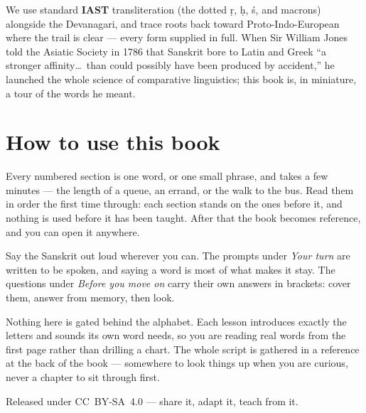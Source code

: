 \documentclass[11pt,twoside]{book}
\begin{document}
We use standard \textbf{IAST} transliteration (the dotted \d{r}, \d{h}, \'{s}, and
macrons) alongside the Devanagari, and trace roots back toward Proto-Indo-European
where the trail is clear --- every form supplied in full. When Sir William Jones
told the Asiatic Society in 1786 that Sanskrit bore to Latin and Greek ``a
stronger affinity\ldots\ than could possibly have been produced by accident,'' he
launched the whole science of comparative linguistics; this book is, in miniature,
a tour of the words he meant.

\section*{How to use this book}

Every numbered section is one word, or one small phrase, and takes a few
minutes --- the length of a queue, an errand, or the walk to the bus. Read them
in order the first time through: each section stands on the ones before it, and
nothing is used before it has been taught. After that the book becomes
reference, and you can open it anywhere.

Say the Sanskrit out loud wherever you can. The prompts under \emph{Your turn}
are written to be spoken, and saying a word is most of what makes it stay. The
questions under \emph{Before you move on} carry their own answers in brackets:
cover them, answer from memory, then look.

Nothing here is gated behind the alphabet. Each lesson introduces exactly the
letters and sounds its own word needs, so you are reading real words from the
first page rather than drilling a chart. The whole script is gathered in a
reference at the back of the book --- somewhere to look things up when you are
curious, never a chapter to sit through first.

Released under CC~BY-SA~4.0 --- share it, adapt it, teach from it.

\tableofcontents

\mainmatter


\end{document}

